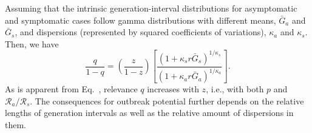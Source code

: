 Assuming that the intrinsic generation-interval distributions for asymptomatic and symptomatic cases follow gamma distributions with different means, $\bar G_a$ and  $\bar G_s$, and dispersions (represented by squared coefficients of variations), $\kappa_a$ and $\kappa_s$. 
Then, we have
\begin{equation}
\frac{q}{1-q}=\left(\frac{z}{1-z}\right)\left[\frac{(1 + \kappa_s r \bar G_s)^{1/\kappa_s}}{(1 + \kappa_a r \bar G_a)^{1/\kappa_a}}\right].
\label{eq.gammaratio}
\end{equation}
As is apparent from Eq.~, relevance $q$ increases with $z$, i.e., with both $p$ and $\mathcal R_a/\mathcal R_s$. The consequences for outbreak potential further depends on the relative lengths of generation intervals as well as the relative amount of dispersions in them.


